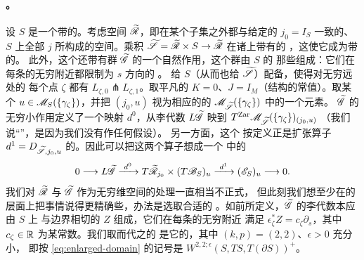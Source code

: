 \paragraph{\trAutomaticRegularity。}\label{sub:automatic-regularity}
设 $S$ 是一个带\trStriplikeEnd{}的\trConnected\trRiemann\trSurface。考虑空间%
$\widetilde{\mathscr{R}}$，即在某个\trCompact{}子集之外都与给定的 $j_0=I_S$ 一致的、%
$S$ 上全部\trComplexStructure{} $j$ 所构成的空间。乘积 $\widetilde{\scr{S}}=%
\widetilde{\scr{R}}\times S\to\widetilde{\scr{R}}$ 在诸\trFiber{}上带有\trTautological{}的%
\trComplexStructure，这使它成为带\trStriplikeEnd{}的\trRiemann\trSurface\trFamily。%
此外，这个\trFamily{}还带有群 $\widetilde{\mathscr{G}}$ 的一个自然作用，这个群由 $S$ 的%
那些\trDiffeomorphism{}组成：它们在每条\trStriplikeEnd{}的无穷附近都限制为 $s$ 方向的%
\trTranslation。
给 $S$（从而也给 $\widetilde{\mathscr{S}}$）配备\trLagrange\trLabel，使得对无穷远处的%
每个点 $\zeta$ 都有 $L_{\zeta,0}\pitchfork L_{\zeta,1}$。取平凡的\trPerturbationDatum{}
$K=0$、$J=I_M$（\trAlmostComplex{}结构的常值\trFamily）。取某个\trPseudoholomorphicMap{}
$u\in\mathscr{M}_S(\{\gamma_\zeta\})$，并把 $(j_0,u)$ 视为相应的\trParametrization{}的%
\trModuliSpace{} $\mathscr{M}_{\widetilde{\mathscr{S}}}(\{\gamma_\zeta\})$ 中的一个元素。%
$\widetilde{\mathscr{G}}$ 的无穷小作用定义了一个\trLinear{}映射 $d^0$，从李代数%
$L\widetilde{\mathscr{G}}$ 映到 \trZariski\trTangentSpace{}
$T^{\mathrm{Zar}}\mathscr{M}_{\widetilde{\mathscr{S}}}(\{\gamma_\zeta\})_{(j_0,u)}$
（我们说“\trZariski\trTangentSpace”，是因为我们没有作任何\trRegularity{}假设）。%
另一方面，这个 \trZariski\trTangentSpace{}按定义正是扩张\trLinearization{}算子%
$d^1=D_{\widetilde{\mathscr{S}},j_0,u}$ 的\trKernel。因此可以把这两个算子想成一个%
\trComplex{}中的\trBoundaryOperator
\begin{equation}\label{eq:automatic-complex}
0\longrightarrow L\widetilde{\mathscr{G}}\xrightarrow{\ d^0\ }
T\widetilde{\mathscr{R}}_{j_0}\times(T\mathscr{B}_S)_u\xrightarrow{\ d^1\ }
(\mathscr{E}_S)_u\longrightarrow 0.
\end{equation}
我们对 $\widetilde{\mathscr{R}}$ 与 $\widetilde{\mathscr{G}}$ 作为无穷维空间的处理一直相当不正式，%
但此刻我们想至少在\trTangentSpace{}的层面上把事情说得更精确些，办法是选取合适的%
\trHilbertSpace{}\trCompletion。如前所定义，$\widetilde{\mathscr{G}}$ 的李代数本应由 $S$ 上%
与边界相切的\trSmooth{}\trVectorField{} $Z$ 组成，它们在每条\trStriplikeEnd{}的无穷附近%
满足 $\epsilon_\zeta^*Z=c_\zeta\partial_s$，其中 $c_\zeta\in\mathbb{R}$ 为某常数。我们取而代之的%
是它的\trWeighted\trSobolevSpace{}\trCompletion，其中 $(k,p)=(2,2)$、$\epsilon>0$ 充分小，%
即按 \eqref{eq:enlarged-domain} 的记号是 $W^{2,2;\epsilon}(S,TS,T(\partial S))^{+}$。%

